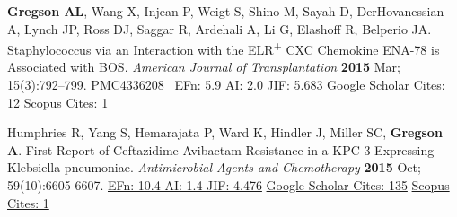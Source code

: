 \documentclass[letterpaper,10pt,sans,dvipsnames,final]{moderncv}%
\newcommand{\txsp}[1]{\textsuperscript{#1}}
\begin{document}
\begin{thebibliography}{1}
  \bibitem[26]{} \textbf{Gregson AL}, Wang X, Injean P, Weigt S, Shino M, Sayah D, DerHovanessian A, Lynch JP, Ross DJ, Saggar R, Ardehali A, Li G, Elashoff R, Belperio JA. Staphylococcus via an Interaction with the {\smaller ELR}\txsp{+} {\smaller CXC} Chemokine {\smaller ENA}-78 is Associated with {\smaller BOS}. {\color{BrickRed}\textit{American Journal of Transplantation}} \textbf{2015} Mar; 15(3):792--799. \href{http://onlinelibrary.wiley.com/doi/10.1111/ajt.13029/abstract}{\aiDoi} {\smaller PMC4336208}~
    {\color{NavyBlue}\href{http://52.6.43.8/projects/journalRank/rankings.php?bsearch=AMERICAN+JOURNAL+OF+TRANSPLANTATION&searchby=journal&orderby=eigenfactor}{{\smaller EFn: 5.9 AI: 2.0 JIF: 5.683}} 
       \href{https://scholar.google.com/scholar?oi=bibs&hl=en&cites=2317703189010929866}{{\smaller Google Scholar Cites: 12}}
     \href{http://www.scopus.com/record/display.uri?eid=2-s2.0-84924018148&origin=resultslist&sort=plf-f&src=s&st1=gregson%2c+a&nlo=&nlr=&nls=&sid=4E3F003C86CD3B740CA1877B02032D8B.y7ESLndDIsN8cE7qwvy6w%3a1990&sot=b&sdt=cl&cluster=scosubtype%2c%22ar%22%2ct%2bscoauthid%2c%226603096521%22%2ct&sl=23&s=AUTHOR-NAME%28gregson%2c+a%29&relpos=1&citeCnt=1&searchTerm=AUTHOR-NAME%28gregson%2C+a%29+AND+%28+LIMIT-TO%28DOCTYPE%2C%5C%26quot%3Bar%5C%26quot%3B+%29+%29++AND+%28+LIMIT-TO%28AU-ID%2C%5C%26quot%3BGregson%2C+Aric+L.%5C%26quot%3B+6603096521%29+%29+}{{\smaller Scopus Cites: 1}}
       }

  \bibitem[27]{} Humphries R, Yang S, Hemarajata P, Ward K, Hindler J, Miller SC, \textbf{Gregson A}. First Report of Ceftazidime-Avibactam Resistance in a KPC-3 Expressing Klebsiella pneumoniae. {\color{BrickRed}\textit{Antimicrobial Agents and Chemotherapy}} \textbf{2015} Oct; 59(10):6605-6607. \href{http://aac.asm.org/content/early/2015/07/14/AAC.01165-15.long}{\aiDoi}
    {\color{NavyBlue}\href{http://www.eigenfactor.org/projects/journalRank/rankings.php?bsearch=ANTIMICROBIAL+AGENTS+AND+CHEMOTHERAPY&searchby=journal&orderby=eigenfactor}{{\smaller EFn: 10.4 AI: 1.4  JIF: 4.476}}
      \href{https://scholar.google.com/scholar?oi=bibs&hl=en&cites=4605070622342235886&as_sdt=5}{{\smaller Google Scholar Cites: 135}}
      \href{http://www.scopus.com/record/display.uri?eid=2-s2.0-84942903035&origin=resultslist&sort=plf-f&src=s&st1=gregson%2c+a&nlo=&nlr=&nls=&sid=4E3F003C86CD3B740CA1877B02032D8B.y7ESLndDIsN8cE7qwvy6w%3a1990&sot=b&sdt=cl&cluster=scosubtype%2c%22ar%22%2ct%2bscoauthid%2c%226603096521%22%2ct&sl=23&s=AUTHOR-NAME%28gregson%2c+a%29&relpos=0&citeCnt=1&searchTerm=AUTHOR-NAME%28gregson%2C+a%29+AND+%28+LIMIT-TO%28DOCTYPE%2C%5C%26quot%3Bar%5C%26quot%3B+%29+%29++AND+%28+LIMIT-TO%28AU-ID%2C%5C%26quot%3BGregson%2C+Aric+L.%5C%26quot%3B+6603096521%29+%29+}{{\smaller Scopus Cites: 1}}
        }


\end{thebibliography}
\end{document}
